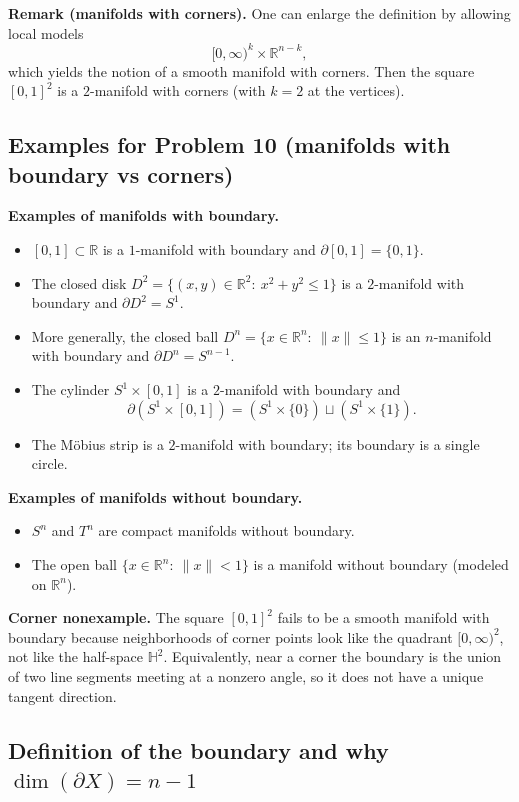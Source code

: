 \documentclass[12pt,a4paper]{article}
\theoremstyle{plain}
\theoremstyle{definition}      %
\begin{document}
\medskip
\noindent\textbf{Remark (manifolds with corners).}
One can enlarge the definition by allowing local models
\[
[0,\infty)^k\times \mathbb{R}^{n-k},
\]
which yields the notion of a smooth manifold with corners.
Then the square $[0,1]^2$ is a $2$-manifold with corners (with $k=2$ at the vertices).


\subsection*{Examples for Problem 10 (manifolds with boundary vs corners)}

\noindent\textbf{Examples of manifolds with boundary.}
\begin{itemize}
	\item $[0,1]\subset\mathbb{R}$ is a $1$-manifold with boundary and $\partial[0,1]=\{0,1\}$.
	\item The closed disk $D^2=\{(x,y)\in\mathbb{R}^2:\ x^2+y^2\le 1\}$ is a $2$-manifold with boundary
	and $\partial D^2=S^1$.
	\item More generally, the closed ball $D^n=\{x\in\mathbb{R}^n:\ \|x\|\le 1\}$ is an $n$-manifold with boundary
	and $\partial D^n=S^{n-1}$.
	\item The cylinder $S^1\times[0,1]$ is a $2$-manifold with boundary and
	\[
	\partial(S^1\times[0,1])=(S^1\times\{0\})\sqcup(S^1\times\{1\}).
	\]
	\item The M\"obius strip is a $2$-manifold with boundary; its boundary is a single circle.
\end{itemize}

\noindent\textbf{Examples of manifolds without boundary.}
\begin{itemize}
	\item $S^n$ and $T^n$ are compact manifolds without boundary.
	\item The open ball $\{x\in\mathbb{R}^n:\ \|x\|<1\}$ is a manifold without boundary (modeled on $\mathbb{R}^n$).
\end{itemize}

\medskip
\noindent\textbf{Corner nonexample.}
The square $[0,1]^2$ fails to be a smooth manifold with boundary because neighborhoods of corner points
look like the quadrant $[0,\infty)^2$, not like the half-space $\mathbb{H}^2$.
Equivalently, near a corner the boundary is the union of two line segments meeting at a nonzero angle,
so it does not have a unique tangent direction.



\subsection*{Definition of the boundary and why $\dim(\partial X)=n-1$}
\end{document}
